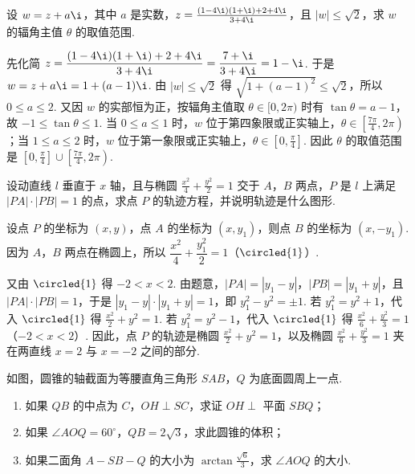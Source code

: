 \begin{problem}
设 \(w = z + a\i\)，其中 \(a\) 是实数，\(z = \frac{(1 - 4\i)(1 + \i) + 2 + 4\i}{3 + 4\i}\)，且 \(|w| \leqslant \sqrt{2}\)，求 \(w\) 的辐角主值 \(\theta\) 的取值范围.
\end{problem}

\begin{solution}
先化简 \(z = \dfrac{(1 - 4\i)(1 + \i) + 2 + 4\i}{3 + 4\i}
= \dfrac{7 + \i}{3 + 4\i}
= 1 - \i\).
于是 \(w = z + a\i = 1 + (a - 1)\i\). 由 \(|w| \leqslant \sqrt{2}\) 得 \(\sqrt{1 + (a - 1)^2} \leqslant \sqrt{2}\)，所以 \(0 \leqslant a \leqslant 2\). 又因 \(w\) 的实部恒为正，按辐角主值取 \(\theta\in[0,2\pi)\) 时有 \(\tan\theta=a-1\)，故 \(-1\leqslant\tan\theta\leqslant1\). 当 \(0\leqslant a\leqslant1\) 时，\(w\) 位于第四象限或正实轴上，\(\theta\in\left[\frac{7\pi}{4},2\pi\right)\)；当 \(1\leqslant a\leqslant2\) 时，\(w\) 位于第一象限或正实轴上，\(\theta\in\left[0,\frac{\pi}{4}\right]\). 因此 \(\theta\) 的取值范围是 \(\left[0,\frac{\pi}{4}\right] \cup \left[\frac{7\pi}{4},2\pi\right)\).
\end{solution}

\begin{problem}
设动直线 \(l\) 垂直于 \(x\) 轴，且与椭圆 \(\frac{x^2}{4} + \frac{y^2}{2} = 1\) 交于 \(A\)，\(B\) 两点，\(P\) 是 \(l\) 上满足 \(|PA| \cdot |PB| = 1\) 的点，求点 \(P\) 的轨迹方程，并说明轨迹是什么图形.
\end{problem}

\begin{solution}
设点 \(P\) 的坐标为 \((x,y)\)，点 \(A\) 的坐标为 \((x,y_1)\)，则点 \(B\) 的坐标为 \((x,-y_1)\). 因为 \(A\)，\(B\) 两点在椭圆上，所以 \(\dfrac{x^2}{4} + \dfrac{y_1^2}{2} = 1\)（\(\circled{1}\)）.

又由 \(\circled{1}\) 得 \(-2 < x < 2\). 由题意，\(|PA| = |y_1 - y|\)，\(|PB| = |y_1 + y|\)，且 \(|PA|\cdot|PB| = 1\)，于是 \(|y_1 - y|\cdot|y_1 + y| = 1\)，即 \(y_1^2 - y^2 = \pm 1\). 若 \(y_1^2 = y^2 + 1\)，代入 \(\circled{1}\) 得 \(\frac{x^2}{2} + y^2 = 1\). 若 \(y_1^2 = y^2 - 1\)，代入 \(\circled{1}\) 得 \(\frac{x^2}{6} + \frac{y^2}{3} = 1\)（\(-2 < x < 2\)）. 因此，点 \(P\) 的轨迹是椭圆 \(\frac{x^2}{2} + y^2 = 1\)，以及椭圆 \(\frac{x^2}{6} + \frac{y^2}{3} = 1\) 夹在两直线 \(x = 2\) 与 \(x = -2\) 之间的部分.
\end{solution}

\begin{problem}
如图，圆锥的轴截面为等腰直角三角形 \(SAB\)，\(Q\) 为底面圆周上一点.

\begin{enumerate}
\item 如果 \(QB\) 的中点为 \(C\)，\(OH \perp SC\)，求证 \(OH \perp\) 平面 \(SBQ\)；
\item 如果 \(\angle AOQ = 60^{\circ}\)，\(QB = 2\sqrt{3}\)，求此圆锥的体积；
\item 如果二面角 \(A-SB-Q\) 的大小为 \(\arctan \frac{\sqrt{6}}{3}\)，求 \(\angle AOQ\) 的大小.
\end{enumerate}

\end{problem}

